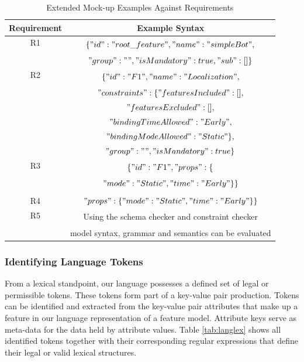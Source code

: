 \documentclass[conference]{IEEEtran}
\begin{document}
\begin{table}[htbp]
\caption{Extended Mock-up Examples Against Requirements}
\begin{center}
\begin{tabular}{|c|c|}
\hline
    Requirement & Example Syntax  \\ \hline
     R1 & \multirow{2}{*}{$\{"id":"root\_feature","name":"simpleBot",$}\\
                        & \\
                        & $"group": "","isMandatory": true,"sub": []\}$\\ \hline
     R2 & \multirow{2}{*}{$\{"id": "F1","name": "Localization",$}\\ 
                        & \\
                        & $"constraints": \{"featuresIncluded": [],$\\ 
                        & $"featuresExcluded": [],$\\
                        &$"bindingTimeAllowed":"Early",$ \\
                        & $"bindingModeAllowed":"Static"\},$\\ 
                        & $"group": "","isMandatory": true\}$ \\
                         \hline
     R3 &  \multirow{2}{*}{$\{"id": "F1","props": \{$}\\
            & \\
            & $"mode": "Static","time": "Early"\}\}$\\
            & \\
            \hline
     R4 & $"props": \{"mode": "Static","time": "Early"\}\}$\\ \hline
     R5 & \multirow{2}{*}{Using the schema checker and constraint checker}\\ 
        & \\
        & model syntax, grammar and semantics can be evaluated\\ \hline
\end{tabular}
\label{tab:reqext}
\end{center}
\end{table}

\subsubsection{Identifying Language Tokens}
From a lexical standpoint, our language possesses a defined set of legal or permissible tokens. These tokens form part of a key-value pair production. Tokens can be identified and extracted from the key-value pair attributes that make up a feature in our language representation of a feature model. Attribute keys serve as meta-data for the data held by attribute values. Table \ref{tab:langlex} shows all identified tokens together with their corresponding regular expressions that define their legal or valid lexical structures.
\end{document}
